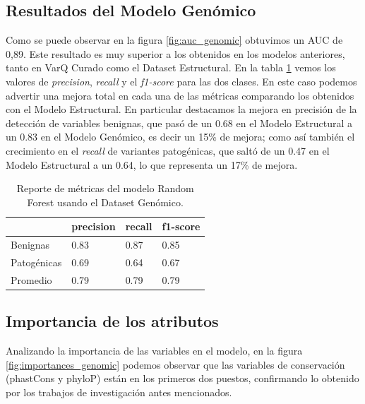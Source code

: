 \subsection{Resultados del Modelo Genómico}

Como se puede observar en la figura \ref{fig:auc_genomic} obtuvimos un AUC de 0,89. Este resultado es muy superior a los obtenidos en los modelos anteriores, tanto en VarQ Curado como el Dataset Estructural. En la tabla \ref{tab:metrics_genomic} vemos los valores de \textit{precision}, \textit{recall} y el \textit{f1-score} para las dos clases. En este caso podemos advertir una mejora total en cada una de las métricas comparando los obtenidos con el Modelo Estructural. En particular destacamos la mejora en precisión de la detección de variables benignas, que pasó de un 0.68 en el Modelo Estructural a un 0.83 en el Modelo Genómico, es decir un 15\% de mejora; como así también el crecimiento en el \textit{recall} de variantes patogénicas, que saltó de un 0.47 en el Modelo Estructural a un 0.64, lo que representa un 17\% de mejora.

\begin{table}[H]
\centering
\begin{tabular}{|l|l|l|l|}
\hline
             & precision & recall & f1-score \\ \hline
Benignas     & 0.83      & 0.87   & 0.85     \\ \hline
Patogénicas  & 0.69      & 0.64   & 0.67     \\ \hline
Promedio     & 0.79      & 0.79   & 0.79     \\ \hline
\end{tabular}
\caption{Reporte de métricas del modelo Random Forest usando el Dataset Genómico.}
\label{tab:metrics_genomic}
\end{table}



\subsection{Importancia de los atributos}
Analizando la importancia de las variables en el modelo, en la figura \ref{fig:importances_genomic} podemos observar que las variables de conservación (phastCons y phyloP) están en los primeros dos puestos, confirmando lo obtenido por los trabajos de investigación antes mencionados. 

